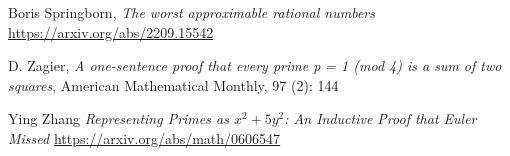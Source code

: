 \documentclass[12pt,a4paper]{amsart}
\begin{document}
Boris Springborn,
\textit{The worst approximable rational numbers}
\url{https://arxiv.org/abs/2209.15542}



D. Zagier,
 \textit{A one-sentence proof that every prime p = 1 (mod 4) is a sum of two squares}, 
 American Mathematical Monthly, 97 (2): 144
 
Ying Zhang
\textit{Representing Primes as $x^2 + 5y^2$: An Inductive Proof that Euler Missed}
\url{https://arxiv.org/abs/math/0606547}


 
\end{document}

